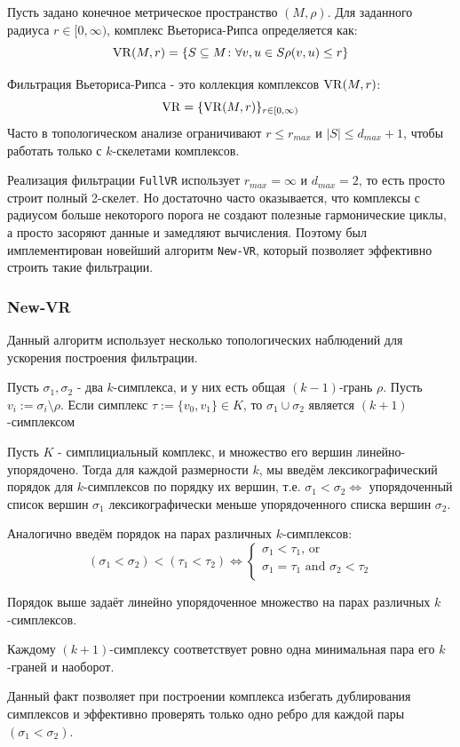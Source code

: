 \documentclass{article}
\begin{document}
\begin{definition}
Пусть задано конечное метрическое пространство $(M,\rho)$. Для заданного радиуса $r\in[0,\infty)$, комплекс Вьеториса-Рипса определяется как:
\[\mathbb{\rm{VR}}(M, r) = \{S \subseteq M \colon \forall v,u\in S\q \rho(v, u) \leq r\}\]
\end{definition}
Фильтрация Вьеториса-Рипса - это коллекция комплексов $\mathbb{\rm{VR}}(M, r)$:
\[\mathbb{\rm{VR}} = \{\mathbb{\rm{VR}}(M, r)\}_{r\in[0,\infty)}\]
Часто в топологическом анализе ограничивают $r \leq r_{max}$ и $|S| \leq d_{max} + 1$, чтобы работать только с $k$-скелетами комплексов.

Реализация фильтрации \texttt{FullVR} использует $r_{max} = \infty$ и $d_{max} = 2$, то есть просто строит полный 2-скелет. Но достаточно часто оказывается, что комплексы с радиусом больше некоторого порога не создают полезные гармонические циклы, а просто засоряют данные и замедляют вычисления. Поэтому был имплементирован новейший алгоритм \texttt{New-VR}, который позволяет эффективно строить такие фильтрации.

\subsubsection{New-VR}
Данный алгоритм использует несколько топологических наблюдений для ускорения построения фильтрации.
\begin{lemma}
  Пусть $\sigma_1, \sigma_2$ - два $k$-симплекса, и у них есть общая $(k-1)$-грань $\rho$. Пусть $v_i := \sigma_i \setminus \rho$. Если симплекс $\tau := \{v_0, v_1\}\in K$, то $\sigma_1 \cup \sigma_2$ является $(k+1)$-симплексом
\end{lemma}
\begin{definition}
  Пусть $K$ - симплициальный комплекс, и множество его вершин линейно-упорядочено. Тогда для каждой размерности $k$, мы введём лексикографический порядок для $k$-симплексов по порядку их вершин, т.е. $\sigma_1 < \sigma_2 \Leftrightarrow$ упорядоченный список вершин $\sigma_1$ лексикографически меньше упорядоченного списка вершин $\sigma_2$. 

  Аналогично введём порядок на парах различных $k$-симплексов:
  \[(\sigma_1 < \sigma_2) < (\tau_1 < \tau_2) \Leftrightarrow 
    \begin{cases}
      \sigma_1 < \tau_1\text{, or}\\
      \sigma_1 = \tau_1\text{ and }\sigma_2 < \tau_2\\
    \end{cases}\]
\end{definition}
\begin{lemma}
  Порядок выше задаёт линейно упорядоченное множество на парах различных $k$-симплексов.
\end{lemma}
\begin{theorem}
  Каждому $(k+1)$-симплексу соответствует ровно одна минимальная пара его $k$-граней и наоборот.
\end{theorem}
Данный факт позволяет при построении комплекса избегать дублирования симплексов и эффективно проверять только одно ребро для каждой пары $(\sigma_1 < \sigma_2)$.
\end{document}
